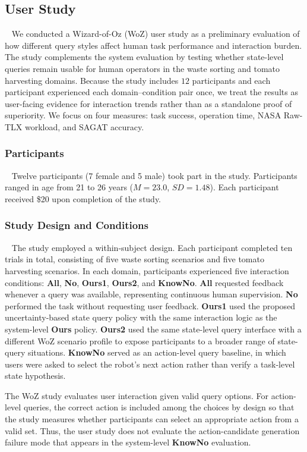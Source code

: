 \subsection{User Study}~\label{exp:user_study}
We conducted a Wizard-of-Oz (WoZ) user study as a preliminary evaluation of how different query styles affect human task performance and interaction burden. The study complements the system evaluation by testing whether state-level queries remain usable for human operators in the waste sorting and tomato harvesting domains. Because the study includes $12$ participants and each participant experienced each domain--condition pair once, we treat the results as user-facing evidence for interaction trends rather than as a standalone proof of superiority. We focus on four measures: task success, operation time, NASA Raw-TLX workload, and SAGAT accuracy.

\subsubsection{Participants}~\label{user:participants}
Twelve participants (7 female and 5 male) took part in the study. Participants ranged in age from 21 to 26 years ($M=23.0$, $SD=1.48$). Each participant received \$20 upon completion of the study.

\subsubsection{Study Design and Conditions}~\label{user:design}
The study employed a within-subject design. Each participant completed ten trials in total, consisting of five waste sorting scenarios and five tomato harvesting scenarios. In each domain, participants experienced five interaction conditions: \textbf{All}, \textbf{No}, \textbf{Ours1}, \textbf{Ours2}, and \textbf{KnowNo}. \textbf{All} requested feedback whenever a query was available, representing continuous human supervision. \textbf{No} performed the task without requesting user feedback. \textbf{Ours1} used the proposed uncertainty-based state query policy with the same interaction logic as the system-level \textbf{Ours} policy. \textbf{Ours2} used the same state-level query interface with a different WoZ scenario profile to expose participants to a broader range of state-query situations. \textbf{KnowNo} served as an action-level query baseline, in which users were asked to select the robot's next action rather than verify a task-level state hypothesis.

The WoZ study evaluates user interaction given valid query options. For action-level queries, the correct action is included among the choices by design so that the study measures whether participants can select an appropriate action from a valid set. Thus, the user study does not evaluate the action-candidate generation failure mode that appears in the system-level \textbf{KnowNo} evaluation.

